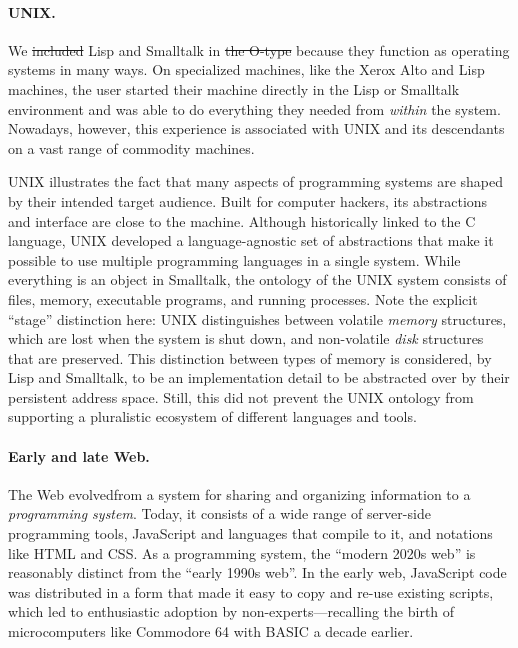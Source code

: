 \documentclass[english,submission]{programming}
\providecommand{\DIFadd}[1]{{\protect\color{blue}\uwave{#1}}} %
\providecommand{\DIFdel}[1]{{\protect\color{red}\sout{#1}}}                      %
\providecommand{\DIFaddbegin}{} %
\providecommand{\DIFaddend}{} %
\providecommand{\DIFdelbegin}{} %
\providecommand{\DIFdelend}{} %
\begin{document}
\paragraph{UNIX.}

We \DIFdelbegin \DIFdel{included }\DIFdelend \DIFaddbegin \DIFadd{include }\DIFaddend Lisp and Smalltalk in \DIFdelbegin \DIFdel{the O-type }\DIFdelend \DIFaddbegin \DIFadd{this group }\DIFaddend because they function as
operating systems in many ways. On specialized machines, like the Xerox
Alto and Lisp machines, the user started their machine directly in the
Lisp or Smalltalk environment and was able to do everything they needed
from \emph{within} the system. Nowadays, however, this experience is
associated with UNIX and its descendants on a vast range of commodity
machines.

UNIX illustrates the fact that many aspects of programming systems are
shaped by their intended target audience. Built for computer
hackers\DIFaddbegin \DIFadd{~\mbox{%
\cite{Hackers}}\hspace{0pt}%
}\DIFaddend , its abstractions and interface are close to the
machine. Although historically linked to the C language, UNIX developed
a language-agnostic set of abstractions that make it possible to use
multiple programming languages in a single system. While everything is
an object in Smalltalk, the ontology of the UNIX system consists of
files, memory, executable programs, and running processes. Note the
explicit ``stage'' distinction here: UNIX distinguishes between volatile
\emph{memory} structures, which are lost when the system is shut down,
and non-volatile \emph{disk} structures that are preserved. This
distinction between types of memory is considered, by Lisp and
Smalltalk, to be an implementation detail to be abstracted over by their
persistent address space. Still, this did not prevent the UNIX ontology
from supporting a pluralistic ecosystem of different languages and
tools.

\paragraph{Early and late Web.}

The Web evolved\DIFaddbegin \DIFadd{~\mbox{%
\cite{DotCom} }\hspace{0pt}%
}\DIFaddend from a system for sharing and organizing
information to a \emph{programming system}. Today, it consists of a wide
range of server-side programming tools, JavaScript and languages that
compile to it, and notations like HTML and CSS. As a programming system,
the ``modern 2020s web'' is reasonably distinct from the ``early 1990s
web''. In the early web, JavaScript code was distributed in a form that
made it easy to copy and re-use existing scripts, which led to
enthusiastic adoption by non-experts---recalling the birth of
microcomputers like Commodore 64 with BASIC a decade earlier.
\end{document}
